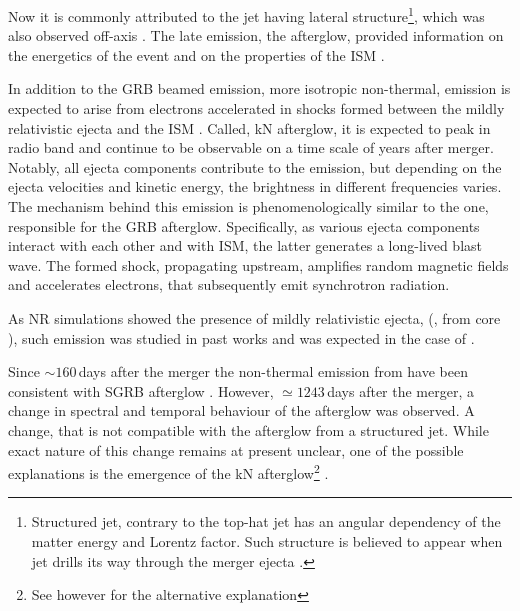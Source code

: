 Now it is commonly attributed to the jet having lateral structure\footnote{
    Structured jet, contrary to the top-hat jet has an angular dependency of the 
    matter energy and Lorentz factor. Such structure is believed to appear 
    when jet drills its way through the merger ejecta \citep{Lamb:2017ych}.
}, which was also observed off-axis 
\citep[\eg][]{Ghirlanda:2018uyx}. 
%
The \GRB{} late emission, the afterglow, provided information on the energetics of the 
event and on the properties of the \ac{ISM} \citep[\eg][]{Hajela:2019mjy}. 



In addition to the \ac{GRB} beamed emission, more isotropic non-thermal,
emission is expected to arise from electrons accelerated in shocks formed between the 
mildly relativistic ejecta and the \ac{ISM} \citep{Nakar:2011cw}. 
Called, \ac{kN} afterglow, it is expected to peak in radio band and continue 
to be observable on a time scale of years 
after merger. Notably, all ejecta components contribute to the emission, 
but depending on the ejecta velocities and kinetic energy, 
the brightness in different frequencies varies. 
%
The mechanism behind this emission is phenomenologically similar to the one, 
responsible for the \ac{GRB} afterglow. Specifically, as various ejecta components 
interact with each other and with \ac{ISM}, the latter generates a long-lived blast wave. 
The formed shock, propagating upstream, amplifies random magnetic fields and accelerates 
electrons, that subsequently emit synchrotron radiation. %

As \ac{NR} simulations showed the presence of mildly relativistic ejecta, 
(\eg, from core \bnc{}), such emission was studied in past works 
\citep[\eg][]{Piran:2012wd,Hotokezaka:2015eja,Hotokezaka:2018gmo,Radice:2018pdn} 
and was expected in the case of \GW{} \citep[\eg][]{Kathirgamaraju:2018mac}.

Since ${\sim}160\,$days after the merger the non-thermal emission from \GW{} have been 
consistent with \ac{SGRB} afterglow \citep{Troja:2020pzf,Hajela:2019mjy}. 
However, ${\simeq}1243\,$days after the merger, a 
change in spectral and temporal behaviour of the afterglow was observed.
A change, that is not compatible with the afterglow from a structured jet. 
While exact nature of this change remains at present unclear, one 
of the possible explanations is the emergence of the 
\ac{kN} afterglow\footnote{
    See however \citet{Troja:2021xsw} for the alternative explanation
} \citep{Hajela:2021faz}.

